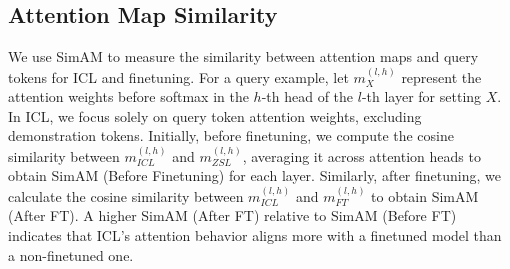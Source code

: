 \subsection*{Attention Map Similarity}
We use SimAM to measure the similarity between attention maps and query tokens for ICL and finetuning.
For a query example, let $m^{(l,h)}_X$ represent the attention weights before softmax in the $h$-th head of the $l$-th layer for setting $X$. In ICL, we focus solely on query token attention weights, excluding demonstration tokens. Initially, before finetuning, we compute the cosine similarity between $m^{(l,h)}_{ICL}$ and $m^{(l,h)}_{ZSL}$, averaging it across attention heads to obtain SimAM (Before Finetuning) for each layer.
Similarly, after finetuning, we calculate the cosine similarity between $m^{(l,h)}_{ICL}$ and $m^{(l,h)}_{FT}$ to obtain SimAM (After FT). A higher SimAM (After FT) relative to SimAM (Before FT) indicates that ICL's attention behavior aligns more with a finetuned model than a non-finetuned one.